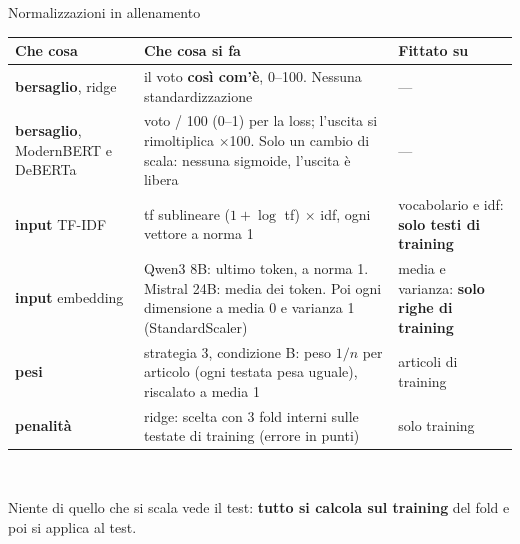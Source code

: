 \documentclass[aspectratio=169]{beamer}
\newcommand{\hl}[1]{\textbf{#1}}
\begin{document}
\begin{frame}{Normalizzazioni in allenamento}
  \centering\scriptsize
  \begin{tabular}{>{\raggedright\arraybackslash}p{}>{\raggedright\arraybackslash}p{}>{\raggedright\arraybackslash}p{}}
    \toprule
    \textbf{Che cosa} & \textbf{Che cosa si fa} & \textbf{Fittato su} \\
    \midrule
    \hl{bersaglio}, ridge & il voto \hl{cos\`i com'\`e}, 0--100. Nessuna standardizzazione & --- \\
    \addlinespace
    \hl{bersaglio}, ModernBERT e DeBERTa & voto / 100 (0--1) per la loss; l'uscita si rimoltiplica $\times$100. Solo un cambio di
    scala: nessuna sigmoide, l'uscita \`e libera & --- \\
    \addlinespace
    \hl{input} TF-IDF & tf sublineare ($1+\log$ tf) $\times$ idf, ogni vettore a norma 1 & vocabolario e idf: \hl{solo testi di
    training} \\
    \addlinespace
    \hl{input} embedding & Qwen3 8B: ultimo token, a norma 1. Mistral 24B: media dei token. Poi ogni dimensione a media 0 e
    varianza 1 (StandardScaler) & media e varianza: \hl{solo righe di training} \\
    \addlinespace
    \hl{pesi} & strategia 3, condizione B: peso $1/n$ per articolo (ogni testata pesa uguale), riscalato a media 1 & articoli
    di training \\
    \addlinespace
    \hl{penalit\`a} & ridge: scelta con 3 fold interni sulle testate di training (errore in punti) & solo training \\
    \bottomrule
  \end{tabular}\\[0.8em]
  \raggedright\small
  Niente di quello che si scala vede il test: \hl{tutto si calcola sul training} del fold e poi si applica al test.
\end{frame}
\end{document}
